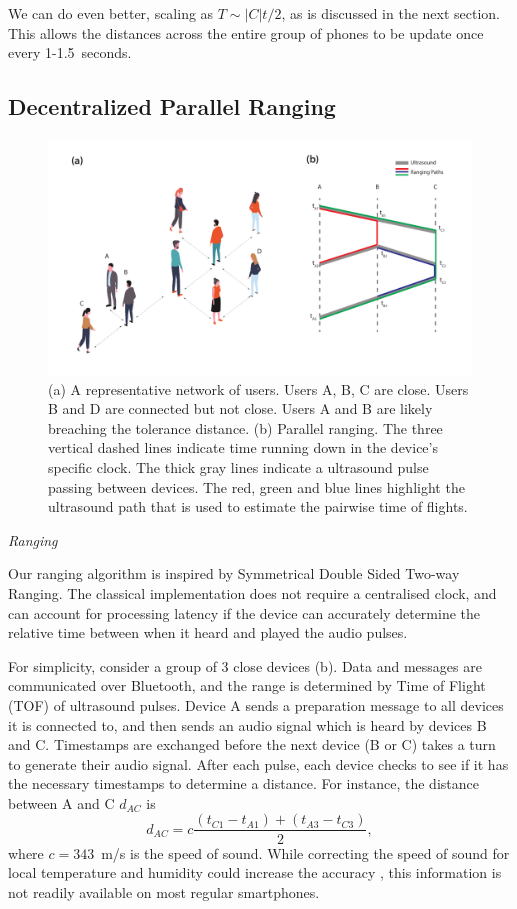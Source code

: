 \documentclass{article}
\begin{document}
We can do even better, scaling as $T\sim|C|t/2$, as is discussed in the next section. This allows the distances across the entire group of phones to be update once every 1-1.5~seconds. 

\subsection{Decentralized Parallel Ranging}

\begin{figure}[tb]
    \centering
    \includegraphics[width=\linewidth]{ranging.pdf}
    \caption{(a) A representative network of users. Users A, B, C are close. Users B and D are connected but not close. Users A and B are likely breaching the tolerance distance. (b) Parallel ranging. The three vertical dashed lines indicate time running down in the device's specific clock. The thick gray lines indicate a ultrasound pulse passing between devices. The red, green and blue lines highlight the ultrasound path that is used to estimate the pairwise time of flights.}
    \label{fig:ranging}
\end{figure}

\emph{Ranging}

Our ranging algorithm is inspired by Symmetrical Double Sided Two-way Ranging. The classical implementation does not require a centralised clock, and can account for processing latency if the device can accurately determine the relative time between when it heard and played the audio pulses.

For simplicity, consider a group of 3 close devices (b). Data and messages are communicated over Bluetooth, and the range is determined by Time of Flight (TOF) of ultrasound pulses. Device A sends a preparation message to all devices it is connected to, and then sends an audio signal which is heard by devices B and C. Timestamps are exchanged before the next device (B or C) takes a turn to generate their audio signal. After each pulse, each device checks to see if it has the necessary timestamps to determine a distance. For instance, the distance between A and C $d_{AC}$ is
\begin{equation*}
    d_{AC} = c \frac{(t_{C1} - t_{A1}) + (t_{A3}-t_{C3})}{2},
\end{equation*}
where $c=343$~m/s is the speed of sound. While correcting the speed of sound for local temperature and humidity could increase the accuracy \cite{Peng2007}, this information is not readily available on most regular smartphones.
\end{document}
